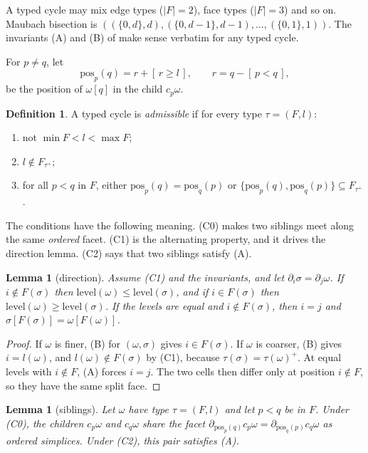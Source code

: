 \documentclass[11pt]{article}
\theoremstyle{plain}
\newtheorem{lemma}[theorem]{Lemma}
\theoremstyle{definition}
\newtheorem{definition}[theorem]{Definition}
\theoremstyle{remark}
\newcommand{\level}{\mathrm{level}}
\newcommand{\pos}{\mathrm{pos}}
\begin{document}
A typed cycle may mix edge types ($|F|=2$), face types ($|F|=3$) and so on.
Maubach bisection is $((\{0,d\},d),(\{0,d-1\},d-1),\dots,(\{0,1\},1))$. The
invariants (A) and (B) of  make sense verbatim for any
typed cycle.

For $p\ne q$, let
\begin{equation}\label{eq:pos}
  \pos_p(q)=r+[\,r\ge l\,],\qquad r=q-[\,p<q\,],
\end{equation}
be the position of $\omega[q]$ in the child $c_p\omega$.

\begin{definition}\label{def:conditions}
A typed cycle is \emph{admissible} if for every type $\tau=(F,l)$:
\begin{enumerate}[label=(C\arabic*),start=0]
\item not $\min F<l<\max F$;
\item $l\notin F_{\tau^+}$;
\item for all $p<q$ in $F$, either $\pos_p(q)=\pos_q(p)$ or
  $\{\pos_p(q),\pos_q(p)\}\subseteq F_{\tau^+}$.
\end{enumerate}
\end{definition}

The conditions have the following meaning. (C0) makes two siblings meet
along the same \emph{ordered} facet. (C1) is the alternating property,
and it drives the direction lemma. (C2) says that two siblings satisfy (A).

\begin{lemma}[direction]\label{lem:dir}
Assume (C1) and the invariants, and let $\partial_i\sigma=\partial_j\omega$.
If $i\notin F(\sigma)$ then $\level(\omega)\le\level(\sigma)$, and if
$i\in F(\sigma)$ then $\level(\omega)\ge\level(\sigma)$. If the levels are
equal and $i\notin F(\sigma)$, then $i=j$ and
$\sigma[F(\sigma)]=\omega[F(\omega)]$.
\end{lemma}

\begin{proof}
If $\omega$ is finer, (B) for $(\omega,\sigma)$ gives $i\in F(\sigma)$. If
$\omega$ is coarser, (B) gives $i=l(\omega)$, and $l(\omega)\notin F(\sigma)$
by (C1), because $\tau(\sigma)=\tau(\omega)^+$. At equal levels with
$i\notin F$, (A) forces $i=j$. The two cells then differ only at
position $i\notin F$, so they have the same split face.
\end{proof}

\begin{lemma}[siblings]\label{lem:sib}
Let $\omega$ have type $\tau=(F,l)$ and let $p<q$ be in $F$. Under (C0), the
children $c_p\omega$ and $c_q\omega$ share the facet
$\partial_{\pos_p(q)}c_p\omega=\partial_{\pos_q(p)}c_q\omega$ as ordered
simplices. Under (C2), this pair satisfies (A).
\end{lemma}
\end{document}
